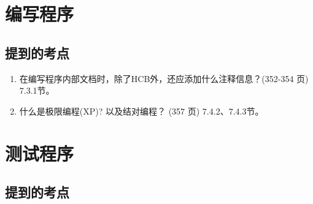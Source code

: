 \documentclass[14pt, letterpaper, UTF8, fontset=windowsnew, heading=true]{article}
\begin{document}
\section{编写程序}

\subsection{提到的考点}

\begin{enumerate}
	\item 在编写程序内部文档时，除了HCB外，还应添加什么注释信息？(352-354 页) \\
	7.3.1节。
	
	\item 什么是极限编程(XP)? 以及结对编程？ (357 页)
	7.4.2、7.4.3节。
	
\end{enumerate}

\section{测试程序}

\subsection{提到的考点}
\end{document}
